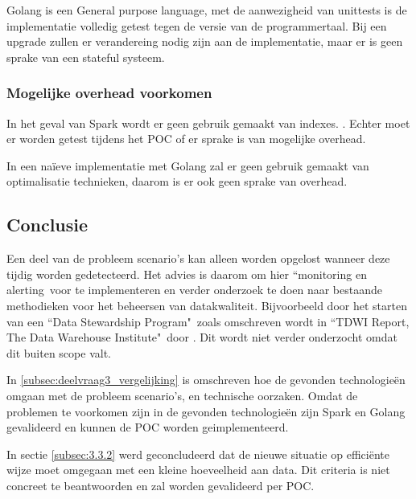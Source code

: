 Golang is een General purpose language, met de aanwezigheid van unittests is de implementatie volledig getest tegen de versie van de programmertaal. Bij een upgrade zullen er verandereing nodig zijn aan de implementatie, maar er is geen sprake van een stateful systeem.

\subsubsection{\textbf{Mogelijke overhead voorkomen}}

In het geval van Spark wordt er geen gebruik gemaakt van indexes. \parencite{armbrust2015spark}. Echter moet er worden getest tijdens het POC of er sprake is van mogelijke overhead.

In een naïeve implementatie met Golang zal er geen gebruik gemaakt van optimalisatie technieken, daarom is er ook geen sprake van overhead.



    
\subsection{Conclusie}

Een deel van de probleem scenario's kan alleen worden opgelost wanneer deze tijdig worden gedetecteerd. Het advies is daarom om hier ``monitoring en alerting\ voor te implementeren en verder onderzoek te doen naar bestaande methodieken voor het beheersen van datakwaliteit. Bijvoorbeeld door het starten van een ``Data Stewardship Program"\ zoals omschreven wordt in ``TDWI Report, The Data Warehouse Institute"\ door \textcite{eckerson2002data}. Dit wordt niet verder onderzocht omdat dit buiten scope valt.

In \ref{subsec:deelvraag3_vergelijking} is omschreven hoe de gevonden technologieën omgaan met de probleem scenario's, en technische oorzaken. 
Omdat de problemen te voorkomen zijn in de gevonden technologieën zijn Spark en Golang gevalideerd en kunnen de POC worden geimplementeerd.

In sectie \ref{subsec:3.3.2} werd geconcludeerd dat de nieuwe situatie op efficiënte wijze moet omgegaan met een kleine hoeveelheid aan data. Dit criteria is niet concreet te beantwoorden en zal worden gevalideerd per POC.